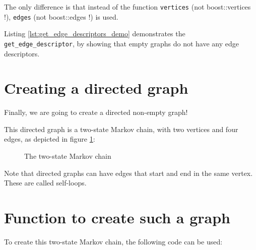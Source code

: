 The only difference is that instead of the 
function \verb;vertices; 
(not boost::vertices !), 
\verb;edges;  
(not boost::edges !) is used.

Listing \ref{lst:get_edge_descriptors_demo}
demonstrates the \verb;get_edge_descriptor;, by showing that empty graphs do
not have any edge descriptors.



\section{Creating a directed graph}
\label{subsec:create_markov_chain_graph}

Finally, we are going to create a directed non-empty graph! 

This directed graph is a two-state Markov chain, with two vertices and four
edges, as depicted in figure \ref{fig:markov_chain}:

\begin{figure}
  \caption{The two-state Markov chain}
  \label{fig:markov_chain}
\end{figure}

Note that directed graphs can have edges that start and end in the same
vertex.
These are called self-loops.

\section{Function to create such a graph}

To create this two-state Markov chain, the following code can be used:

